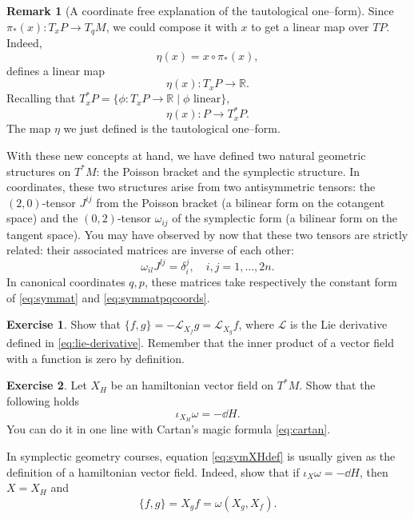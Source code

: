 \documentclass[english,fontsize=11pt,paper=b5]{scrbook}
\numberwithin{equation}{chapter}
\theoremstyle{definition}
\newtheorem{remark}{Remark}[chapter]
\newtheorem{exercise}{Exercise}[chapter]
\begin{document}
\begin{remark}[A coordinate free explanation of the tautological one--form]
      Since $\pi_*(x): T_x P \to T_q M$, we could compose it with $x$ to get a linear map over $TP$. Indeed,
      \begin{equation}
        \eta(x) = x \circ \pi_*(x),
      \end{equation}
      defines a linear map
      \begin{equation}
        \eta(x):T_xP\to\mathbb{R}.
      \end{equation}
      Recalling that $T_x^*P = \big\{\phi: T_x P \to \mathbb{R} \mid \phi\mbox{ linear}\big\}$,
      \begin{equation}
        \eta(x) : P \to T^*_x P.
      \end{equation}
      The map $\eta$ we just defined is the tautological one--form.
    \end{remark}

    With these new concepts at hand, we have defined two natural geometric structures on $T^* M$: the Poisson bracket and the symplectic structure.
    In coordinates, these two structures arise from two antisymmetric tensors: the $(2,0)$-tensor $J^{ij}$ from the Poisson bracket (a bilinear form on the cotangent space) and the $(0,2)$-tensor $\omega_{ij}$ of the symplectic form (a bilinear form on the tangent space).
    You may have observed by now that these two tensors are strictly related: their associated matrices are inverse of each other:
    \begin{equation}\label{eq:omegaJinverse}
      \omega_{il}J^{lj} = \delta_i^j, \quad i,j = 1,\ldots, 2n.
    \end{equation}
    In canonical coordinates $q,p$, these matrices take respectively the constant form of \eqref{eq:symmat} and \eqref{eq:symmatpqcoords}.

    \begin{exercise}
      Show that $\big\{f,g\big\} = -\mathcal{L}_{X_f} g = \mathcal{L}_{X_g} f$, where $\mathcal{L}$ is the Lie derivative defined in \eqref{eq:lie-derivative}.
      Remember that the inner product of a vector field with a function is zero by definition.
    \end{exercise}

    \begin{exercise}\label{exe:altdefomega}
      Let $X_H$ be an hamiltonian vector field on $T^*M$.
      Show that the following holds
      \begin{equation}\label{eq:symXHdef}
        \iota_{X_H}\omega = -\dd H.
      \end{equation}
      You can do it in one line with Cartan's magic formula \eqref{eq:cartan}.

      In symplectic geometry courses, equation \eqref{eq:symXHdef} is usually given as the definition of a hamiltonian vector field.
      Indeed, show that if $\iota_{X}\omega = -\dd H$, then $X=X_H$ and
      \begin{equation}
        \{f,g\} = X_g f = \omega(X_g, X_f).
      \end{equation}
    \end{exercise}
\end{document}
